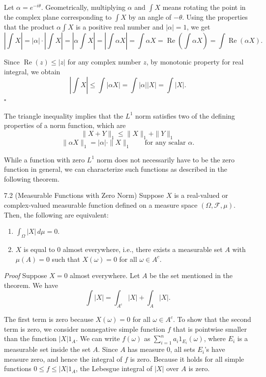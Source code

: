 Let $\alpha = e^{-i\theta}$. Geometrically, multiplying $\alpha$ and $\int X$ means rotating the point in the complex plane corresponding to $\int X$ by an angle of $-\theta$. Using the properties that the product $\alpha\int X$ is a positive real number and $|\alpha|=1$, we get
\[
\left|\int X\right|
=
|\alpha|\cdot \left|\int X\right|
=
\left|\alpha \int X\right|
=
\left|\int \alpha X\right|
=
\int \alpha X
=
\operatorname{Re}\left(\int \alpha X\right)
=
\int \operatorname{Re}(\alpha X).
\]

Since $\operatorname{Re}(z)\le |z|$ for any complex number $z$, by monotonic property for real integral, we obtain
\[
\left|\int X\right|
\le
\int |\alpha X|
=
\int |\alpha||X|
=
\int |X|.
\]
\hfill $\square$

The triangle inequality implies that the $L^1$ norm satisfies two of the defining properties of a norm function, which are
\[
\|X+Y\|_1 \le \|X\|_1 + \|Y\|_1
\]
\[
\|\alpha X\|_1 = |\alpha|\cdot \|X\|_1 \qquad \text{for any scalar } \alpha.
\]

While a function with zero $L^1$ norm does not necessarily have to be the zero function in general, we can characterize such functions as described in the following theorem.

\begin{thmbox}{7.2 (Measurable Functions with Zero Norm)}
Suppose $X$ is a real-valued or complex-valued measurable function defined on a measure space $(\Omega,\mathcal{F},\mu)$. Then, the following are equivalent:
\begin{enumerate}[label=\arabic*.]
    \item $\int_{\Omega} |X|\, d\mu = 0$.
    \item $X$ is equal to $0$ almost everywhere, i.e., there exists a measurable set $A$ with $\mu(A)=0$ such that $X(\omega)=0$ for all $\omega \in A^c$.
\end{enumerate}
\end{thmbox}

\textit{Proof} Suppose $X=0$ almost everywhere. Let $A$ be the set mentioned in the theorem. We have
\[
\int |X| = \int_{A^c} |X| + \int_A |X|.
\]

The first term is zero because $X(\omega)=0$ for all $\omega \in A^c$. To show that the second term is zero, we consider nonnegative simple function $f$ that is pointwise smaller than the function $|X|1_A$. We can write $f(\omega)$ as $\sum_{i=1}^{n} a_i 1_{E_i}(\omega)$, where $E_i$ is a measurable set inside the set $A$. Since $A$ has measure $0$, all sets $E_i$'s have measure zero, and hence the integral of $f$ is zero. Because it holds for all simple functions $0\le f\le |X|1_A$, the Lebesgue integral of $|X|$ over $A$ is zero.

